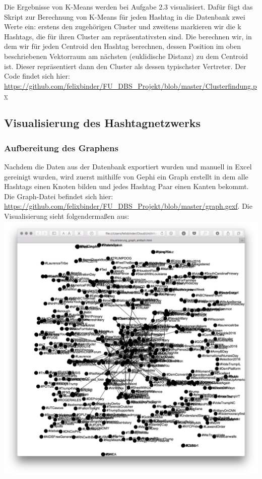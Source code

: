 \documentclass[BCOR0mm,fontsize=12pt,paper=a4,final,numbers=noenddot]{scrartcl}
\begin{document}
Die Ergebnisse von K-Means werden bei Aufgabe 2.3 visualisiert. Dafür fügt das Skript zur Berechnung von K-Means für jeden Hashtag in die Datenbank zwei Werte ein: erstens den zugehörigen Cluster und zweitens markieren wir die k Hashtags, die für ihren Cluster am repräsentativsten sind. Die berechnen wir, in dem wir für jeden Centroid den Hashtag berechnen, dessen Position im oben beschriebenen Vektorraum am nächsten (euklidische Distanz) zu dem Centroid ist. Dieser repräsentiert dann den Cluster als dessen typischster Vertreter. Der Code findet sich hier: \url{https://github.com/felixbinder/FU_DBS_Projekt/blob/master/Clusterfindung.py}

\subsection{Visualisierung des Hashtagnetzwerks}

\subsubsection{Aufbereitung des Graphens}

Nachdem die Daten aus der Datenbank exportiert wurden und manuell in Excel gereinigt wurden, wird zuerst mithilfe von Gephi ein Graph erstellt in dem alle Hashtags einen Knoten bilden und jedes Hashtag Paar einen Kanten bekommt. Die Graph-Datei befindet sich hier: \url{https://github.com/felixbinder/FU_DBS_Projekt/blob/master/graph.gexf}. Die Visualisierung sieht folgendermaßen aus: \\
\includegraphics[width=1\textwidth]{2-2visualisierung.png}
\end{document}
